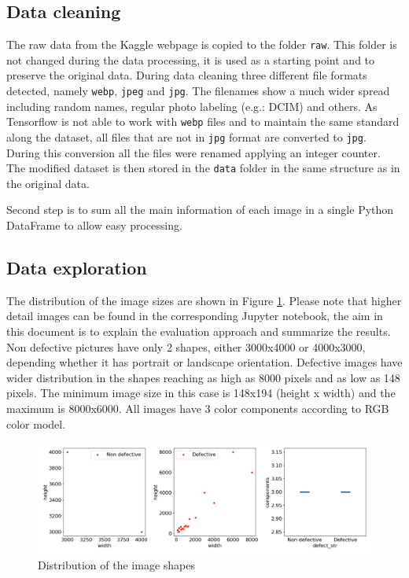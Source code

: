 \documentclass[10pt, final]{article}
\begin{document}
		\subsection{Data cleaning}			
			The raw data from the Kaggle webpage \cite{noauthor_railway_nodate} is copied to the folder \lstinline{raw}.
			This folder is not changed during the data processing, it is used as a starting point and to preserve the 
			original data.
			During data cleaning three different file formats detected, namely \lstinline{webp}, \lstinline{jpeg} 
			and \lstinline{jpg}.
			The filenames show a much wider spread including random names, regular photo labeling (e.g.: DCIM) and others.
			As Tensorflow is not able to work with \lstinline{webp} files and to maintain the same standard along
			the dataset, all files that are not in \lstinline{jpg} format are converted to \lstinline{jpg}.
			During this conversion all the files were renamed applying an integer counter.
			The modified dataset is then stored in the \lstinline{data} folder in the same structure as in the original data.
			
			Second step is to sum all the main information of each image in a single Python DataFrame to allow easy processing.
		
		\subsection{Data exploration}
			The distribution of the image sizes are shown in Figure \ref{fig:shape_dist}. 
			Please note that higher detail images can be found in the corresponding Jupyter notebook, the aim in this document
			is to explain the evaluation approach and summarize the results.
			Non defective pictures have only 2 shapes, either 3000x4000 or 4000x3000, depending whether it has
			portrait or landscape orientation.
			Defective images have wider distribution in the shapes reaching as high as 8000 pixels and as low as 148 pixels.
			The minimum image size in this case is 148x194 (height x width) and the maximum is 8000x6000.
			All images have 3 color components according to RGB color model.
			\begin{figure}[!ht]
				\centering
				\includegraphics[width=\textwidth]{./tex_graphs/shapes.png}
				\caption{Distribution of the image shapes}
				\label{fig:shape_dist}
			\end{figure}
\end{document}
